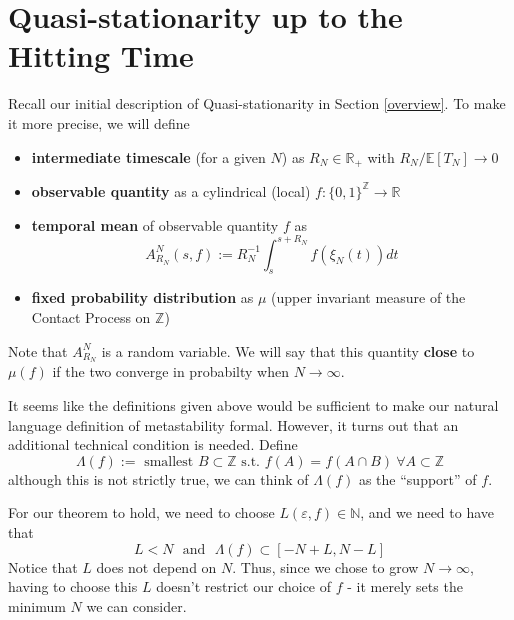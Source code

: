 \documentclass{scrartcl}
\begin{document}
\section{Quasi-stationarity up to the Hitting Time}

Recall our initial description of Quasi-stationarity in Section \ref{overview}. To make it more precise, we will define 
\begin{itemize}
    \item \textbf{intermediate timescale} (for a given $N$) as $R_N \in \mathbb{R}_+$ with $R_N/\mathbb{E}[T_N] \rightarrow 0$
    \item \textbf{observable quantity} as a cylindrical (local) $f:\{0,1\}^\mathbb{Z} \rightarrow \mathbb{R}$
    \item \textbf{temporal mean} of observable quantity $f$ as
    \[
        A^N_{R_N}(s, f) := R_N^{-1}\int_s^{s+R_N}f(\xi_N(t))dt
    \]
    \item \textbf{fixed probability distribution} as $\mu$ (upper invariant measure of the Contact Process on $\mathbb{Z}$)
\end{itemize}
Note that $A^N_{R_N}$ is a random variable. We will say that this quantity \textbf{close} to $\mu(f)$ if the two converge in probabilty when $N \rightarrow \infty$.

It seems like the definitions given above would be sufficient to make our natural language definition of metastability formal. However, it turns out that an additional technical 
condition is needed. Define
    \[
        \Lambda(f) :=  \text{ smallest } B\subset \mathbb{Z} \text{ s.t. } f(A) = f(A\cap B) \ \forall A \subset \mathbb{Z}
    \]
    although this is not strictly true, we can think of $\Lambda(f)$ as the ``support'' of $f$.  

For our theorem to hold, we need to choose $L(\varepsilon, f) \in \mathbb{N}$, and we need to have that
\[
    L < N \text{~~and~~} \Lambda(f) \subset [-N+L, N-L]
\]
Notice that $L$ does not depend on $N$. Thus, since we chose to grow $N \rightarrow \infty$, having to choose this $L$ doesn't restrict our choice of $f$ - it merely sets the minimum
 $N$ we can consider.
\end{document}
